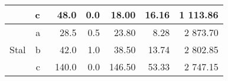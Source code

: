 \begin{table}[H]
{\begin{tabular}{|c|c|r|r|r|r|r|}
                                                                                                     & c~       & 48.0                                                                               & 0.0                                                                                   & 18.00                                                                             & 16.16                                                                                       & 1 113.86                                                                      \\ \hline
    \multirow{3}{*}{Stal}                                                                            & a~       & 28.5                                                                               & 0.5                                                                                   & 23.80                                                                             & 8.28                                                                                        & 2 873.70                                                                      \\ \cline{2-7} 
                                                                                                     & b~       & 42.0                                                                               & 1.0                                                                                   & 38.50                                                                             & 13.74                                                                                       & 2 802.85                                                                      \\ \cline{2-7} 
                                                                                                     & c~       & 140.0                                                                              & 0.0                                                                                   & 146.50                                                                            & 53.33                                                                                       & 2 747.15                                                                      \\ \hline
    \end{tabular}%
    }
    \end{table}
